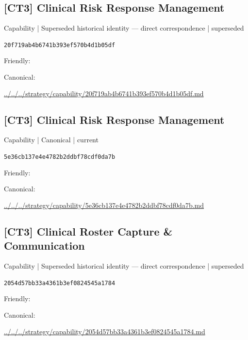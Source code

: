 \documentclass[10pt,a4paper]{article}
\begin{document}
\subsection*{[CT3] Clinical Risk Response Management}
{\small Capability | Superseded historical identity — direct correspondence | superseded}\par
\texttt{20f719ab4b6741b393ef570b4d1b05df}\par
Friendly: \par
Canonical: \par
{\footnotesize\url{../../../strategy/capability/20f719ab4b6741b393ef570b4d1b05df.md}}\par
\subsection*{[CT3] Clinical Risk Response Management}
{\small Capability | Canonical | current}\par
\texttt{5e36cb137e4e4782b2ddbf78cdf0da7b}\par
Friendly: \par
Canonical: \par
{\footnotesize\url{../../../strategy/capability/5e36cb137e4e4782b2ddbf78cdf0da7b.md}}\par
\subsection*{[CT3] Clinical Roster Capture \& Communication}
{\small Capability | Superseded historical identity — direct correspondence | superseded}\par
\texttt{2054d57bb33a4361b3ef0824545a1784}\par
Friendly: \par
Canonical: \par
{\footnotesize\url{../../../strategy/capability/2054d57bb33a4361b3ef0824545a1784.md}}\par
\end{document}
